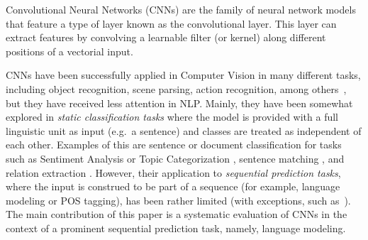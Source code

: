 Convolutional Neural Networks (CNNs) are the family of neural network
models that feature a type of layer known as the convolutional
layer. This layer can extract features by convolving a learnable filter (or
kernel) along different positions of a vectorial input.

CNNs have been successfully applied in Computer Vision in many
different tasks, including object recognition, scene parsing, action
recognition, among others~\cite{Gu:etal:2015}, but they have received less
attention in NLP. Mainly, they have been somewhat explored in
\emph{static classification tasks} where the model is provided with a
full linguistic unit as input (e.g.\ a sentence) and classes are
treated as independent of each other. Examples of this are sentence or
document classification for tasks such as Sentiment Analysis or Topic
Categorization \cite{Kalchbrenner2014conv,kim2014sentence}, sentence
matching
\cite{hu2014convolutional}, and relation extraction
\cite{nguyen2015relation}. However, their application to
\emph{sequential prediction tasks}, where the input is construed to be
part of a sequence (for example, language modeling or POS tagging),
has been rather limited (with exceptions, such
as~). The main contribution of this
paper is a systematic evaluation of CNNs in the context of a prominent
sequential prediction task, namely, language modeling.

